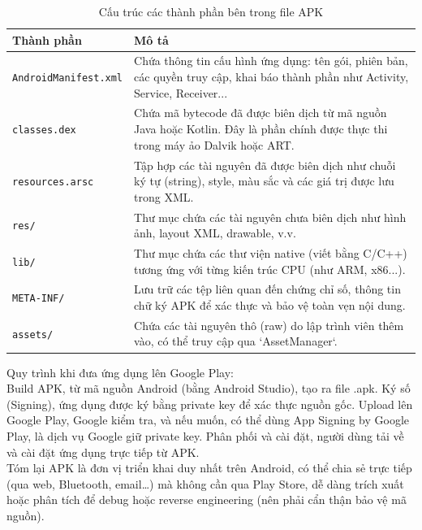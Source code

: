 \begin{flushleft}
        \begin{table}[H]
            \centering
            \renewcommand{\arraystretch}{1.5}
            \begin{tabular}{|l|p{11cm}|}
                \hline
                \textbf{Thành phần} & \textbf{Mô tả} \\
                \hline
                \texttt{AndroidManifest.xml} & Chứa thông tin cấu hình ứng dụng: tên gói, phiên bản, các quyền truy cập, khai báo thành phần như Activity, Service, Receiver\cite{AndroidManifest.xml}... \\
                \hline
                \texttt{classes.dex} & Chứa mã bytecode đã được biên dịch từ mã nguồn Java hoặc Kotlin. Đây là phần chính được thực thi trong máy ảo Dalvik hoặc ART. \\
                \hline
                \texttt{resources.arsc} & Tập hợp các tài nguyên đã được biên dịch như chuỗi ký tự (string), style, màu sắc và các giá trị được lưu trong XML. \\
                \hline
                \texttt{res/} & Thư mục chứa các tài nguyên chưa biên dịch như hình ảnh, layout XML, drawable, v.v. \\
                \hline
                \texttt{lib/} & Thư mục chứa các thư viện native (viết bằng C/C++) tương ứng với từng kiến trúc CPU (như ARM, x86...). \\
                \hline
                \texttt{META-INF/} & Lưu trữ các tệp liên quan đến chứng chỉ số, thông tin chữ ký APK để xác thực và bảo vệ toàn vẹn nội dung. \\
                \hline
                \texttt{assets/} & Chứa các tài nguyên thô (raw) do lập trình viên thêm vào, có thể truy cập qua `AssetManager`. \\
                \hline
            \end{tabular}
            \caption{Cấu trúc các thành phần bên trong file APK}
            \label{table:apk-structure}
            \end{table}            
    
        \hspace*{0.8cm}Quy trình khi đưa ứng dụng lên Google Play:  \\
        \setlength{\parskip}{1em}\hspace*{0.6cm}Build APK, từ mã nguồn Android (bằng Android Studio), tạo ra file .apk. Ký số (Signing), ứng dụng được ký bằng private key để xác thực nguồn gốc. Upload lên Google Play, Google kiểm tra, và nếu muốn, có thể dùng App Signing by Google Play, là dịch vụ Google giữ private key. Phân phối và cài đặt, người dùng tải về và cài đặt ứng dụng trực tiếp từ APK.\\

        \hspace*{0.8cm}Tóm lại APK là đơn vị triển khai duy nhất trên Android, có thể chia sẻ trực tiếp (qua web, Bluetooth, email…) mà không cần qua Play Store, dễ dàng trích xuất hoặc phân tích để debug hoặc reverse engineering (nên phải cẩn thận bảo vệ mã nguồn).
    \end{flushleft}
